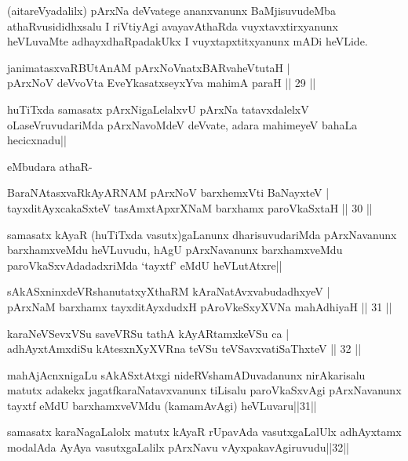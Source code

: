 \begin{artha}
(aitareVyadalilx) pArxNa deVvatege ananxvanunx BaMjisuvudeMba athaRvusididhxsalu \stext I riVtiyAgi avayavAthaRda vuyxtavxtirxyanunx heVLuvaMte adhayxdhaRpadakUkx I vuyxtapxtitxyanunx mADi heVLide.
\end{artha}


\begin{shl}
janimatasxvaRBUtAnAM pArxNoV\s natxBARvaheVtutaH |\\
pArxNoV deVvoV\s ta EveYkasatxseyxYva mahimA paraH \hfill || 29 ||
\end{shl}

\begin{artha}
huTiTxda samasatx pArxNigaLelalxvU pArxNa tatavxdalelxV oLaseVruvudariMda pArxNavoMdeV deVvate, adara mahimeyeV bahaLa hecicxnadu||
\end{artha}

 eMbudara athaR-

\begin{shl}
BaraNAtasxvaRkAyARNAM pArxNoV barxhemxVti BaNayxteV |\\
tayxditAyxcakaSxteV tasAmxtApxrXNaM barxhamx paroVkaSxtaH \hfill || 30 ||
\end{shl}

\begin{artha}
samasatx kAyaR (huTiTxda vasutx)gaLanunx dharisuvudariMda pArxNavanunx barxhamxveMdu heVLuvudu, hAgU pArxNavanunx barxhamxveMdu paroVkaSxvAdadadxriMda `tayxtf' eMdU heVLutAtxre||
\end{artha}

\begin{shl}
sAkASxninxdeVRshanutatxyXthaRM kAraNatAvxvabudadhxyeV |\\
pArxNaM barxhamx tayxditAyxdudxH pAroVkeSxyXVNa mahAdhiyaH \hfill || 31 ||
\end{shl}

\begin{shl}
karaNeVSevxVSu saveVRSu tathA kAyARtamxkeVSu ca |\\
adhAyxtAmxdiSu kAtesxnXyXVRna teVSu teVSavxvatiSaThxteV \hfill || 32 ||
\end{shl}

\begin{artha}
mahAjAcnxnigaLu sAkASxtAtxgi nideRVshamADuvadanunx nirAkarisalu matutx adakekx jagatfkaraNatavxvanunx tiLisalu paroVkaSxvAgi pArxNavanunx tayxtf eMdU barxhamxveVMdu (kamamAvAgi) heVLuvaru||31||

samasatx karaNagaLalolx matutx kAyaR rUpavAda vasutxgaLalUlx adhAyxtamx modalAda AyAya vasutxgaLalilx pArxNavu vAyxpakavAgiruvudu||32||
\end{artha}

